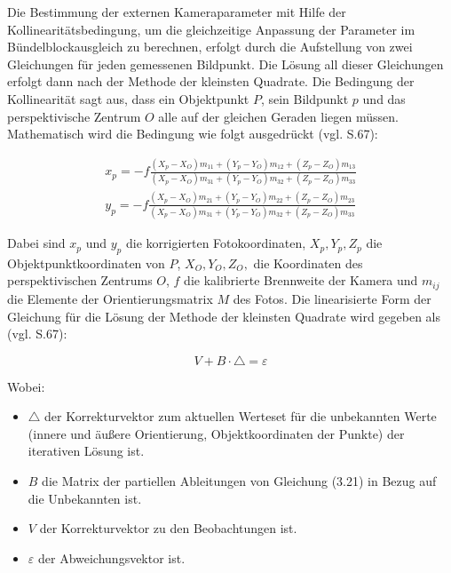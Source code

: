 Die Bestimmung der externen Kameraparameter mit Hilfe der Kollinearitätsbedingung, um die gleichzeitige Anpassung der Parameter im Bündelblockausgleich zu berechnen, erfolgt durch die Aufstellung von zwei Gleichungen für jeden gemessenen Bildpunkt. Die Lösung all dieser Gleichungen erfolgt dann nach der Methode der kleinsten Quadrate. Die Bedingung der Kollinearität sagt aus, dass ein Objektpunkt $P$, sein Bildpunkt $p$ und das perspektivische Zentrum $O$ alle auf der gleichen Geraden liegen müssen. Mathematisch wird die Bedingung wie folgt ausgedrückt (vgl. \cite{comparative_conditions_study} S.67):

\begin{equation}
\begin{aligned}
  x_p = -f \frac{(X_p-X_O)m_{11}+(Y_p-Y_O)m_{12}+(Z_p-Z_O)m_{13}}{(X_p-X_O)m_{31}+(Y_p-Y_O)m_{32}+(Z_p-Z_O)m_{33}} \\
    y_p = -f \frac{(X_p-X_O)m_{21}+(Y_p-Y_O)m_{22}+(Z_p-Z_O)m_{23}}{(X_p-X_O)m_{31}+(Y_p-Y_O)m_{32}+(Z_p-Z_O)m_{33}}
\end{aligned}
\end{equation}

Dabei sind $x_p$ und $y_p$ die korrigierten Fotokoordinaten, $X_p,Y_p,Z_p$ die Objektpunktkoordinaten von $P$, $X_O,Y_O,Z_O,$ die Koordinaten des perspektivischen Zentrums $O$, $f$ die kalibrierte Brennweite der Kamera und $m_{ij}$ die Elemente der Orientierungsmatrix $M$ des Fotos. Die linearisierte Form der Gleichung für die Lösung der Methode der kleinsten Quadrate wird gegeben als (vgl. \cite{comparative_conditions_study} S.67):

\begin{equation}
V+B\cdot\triangle =\varepsilon
\end{equation}

Wobei:
\begin{itemize}
\item $\triangle$ der Korrekturvektor zum aktuellen Werteset für die unbekannten Werte (innere und äußere Orientierung, Objektkoordinaten der Punkte) der iterativen Lösung ist.

\item $B$ die Matrix der partiellen Ableitungen von Gleichung (3.21) in Bezug auf die Unbekannten  ist.

\item $V$ der Korrekturvektor zu den Beobachtungen ist.

\item $\varepsilon$ der Abweichungsvektor ist.
\end{itemize}

